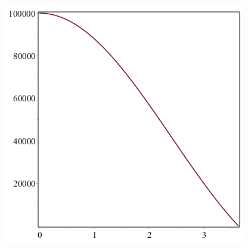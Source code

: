 \documentclass[11pt]{article} %
\begin{document}
\includegraphics[scale=.5]{plots/wd8.png}\\
\end{document}
